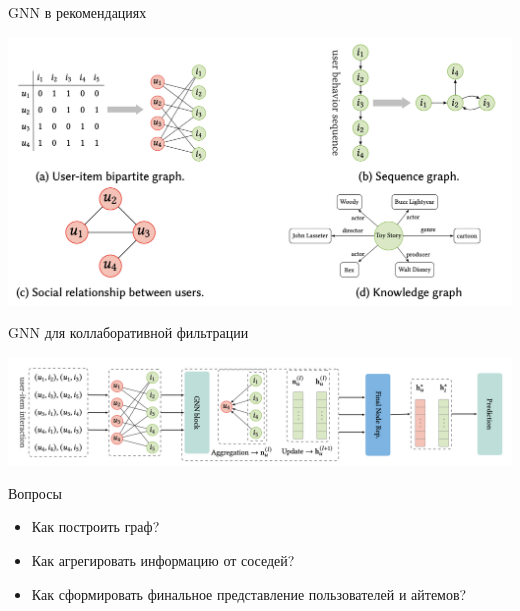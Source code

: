 \documentclass[11pt,aspectratio=169,handout]{beamer}
\begin{document}
\begin{frame}{GNN в рекомендациях \cite{GNNSURVEY}}

\begin{center}
\includegraphics[scale=0.3]{images/gnn-rec-problems.png}
\end{center}

\end{frame}

\begin{frame}{GNN для коллаборативной фильтрации}

\begin{center}
\includegraphics[scale=0.3]{images/gnn-cf.png}
\end{center}

Вопросы
\begin{itemize}
\item Как построить граф?
\item Как агрегировать информацию от соседей?
\item Как сформировать финальное представление пользователей и айтемов?
\end{itemize}

\end{frame}
\end{document}

